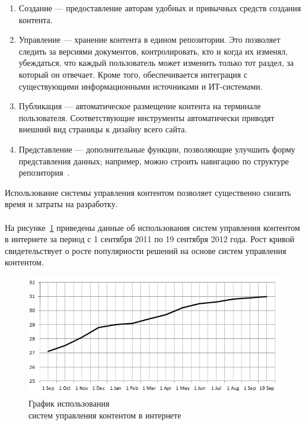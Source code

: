 \begin{enumerate}
\item
  Создание --- предоставление авторам удобных и привычных средств создания контента.

\item
  Управление --- хранение контента в едином репозитории. 
  Это позволяет следить за версиями документов, контролировать, кто и когда их изменял, убеждаться,
  что каждый пользователь может изменить только тот раздел, за который он отвечает.
  Кроме того, обеспечивается интеграция с существующими информационными источниками и ИТ-системами.

\item
  Публикация --- автоматическое размещение контента на терминале пользователя. 
  Соответствующие инструменты автоматически приводят внешний вид страницы к дизайну всего сайта.

\item
  Представление --- дополнительные функции, позволяющие улучшить форму представления данных; например,
  можно строить навигацию по структуре репозитория~\cite{osp_cms_functions}.
\end{enumerate}

Использование системы управления контентом позволяет существенно снизить время и затраты на разработку.

\paragraph{}
На рисунке~\ref{fig:cms_usage_dynamic} приведены данные об использования систем управления контентом в интернете за период
с 1 сентября 2011 по 19 сентября 2012 года. Рост кривой свидетельствует о росте популярности решений на 
основе систем управления контентом.

\begin{figure}[h]
  \centering
  \includegraphics[width=150mm]{pic/dynamic_cms_usage.png}
  \caption{График использования \\ систем управления контентом в интернете}
  \label{fig:cms_usage_dynamic}
\end{figure}

